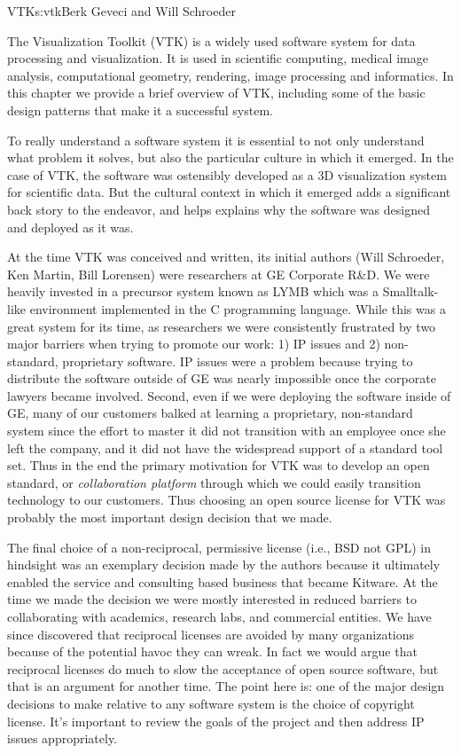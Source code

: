 \begin{aosachapter}{VTK}{s:vtk}{Berk Geveci and Will Schroeder}

The Visualization Toolkit (VTK) is a widely used software system for
data processing and visualization. It is used in scientific computing,
medical image analysis, computational geometry, rendering, image
processing and informatics. In this chapter we provide a brief
overview of VTK, including some of the basic design patterns that make
it a successful system.

To really understand a software system it is essential to not only
understand what problem it solves, but also the particular culture in
which it emerged. In the case of VTK, the software was ostensibly
developed as a 3D visualization system for scientific data. But the
cultural context in which it emerged adds a significant back story to
the endeavor, and helps explains why the software was designed and
deployed as it was.

At the time VTK was conceived and written, its initial authors (Will
Schroeder, Ken Martin, Bill Lorensen) were researchers at GE Corporate
R\&D\@. We were heavily invested in a precursor system known as LYMB
which was a Smalltalk-like environment implemented in the C
programming language. While this was a great system for its time, as
researchers we were consistently frustrated by two major barriers when
trying to promote our work: 1) IP issues and 2) non-standard,
proprietary software. IP issues were a problem because trying to
distribute the software outside of GE was nearly impossible once the
corporate lawyers became involved. Second, even if we were deploying
the software inside of GE, many of our customers balked at learning a
proprietary, non-standard system since the effort to master it did not
transition with an employee once she left the company, and it did not
have the widespread support of a standard tool set. Thus in the end
the primary motivation for VTK was to develop an open standard, or
\emph{collaboration platform} through which we could easily transition
technology to our customers. Thus choosing an open source license for
VTK was probably the most important design decision that we made.

The final choice of a non-reciprocal, permissive license (i.e., BSD
not GPL) in hindsight was an exemplary decision made by the authors
because it ultimately enabled the service and consulting based
business that became Kitware. At the time we made the decision we were
mostly interested in reduced barriers to collaborating with academics,
research labs, and commercial entities. We have since discovered that
reciprocal licenses are avoided by many organizations because of the
potential havoc they can wreak. In fact we would argue that reciprocal
licenses do much to slow the acceptance of open source software, but
that is an argument for another time. The point here is: one of the
major design decisions to make relative to any software system is the
choice of copyright license. It's important to review the goals of the
project and then address IP issues appropriately.


\end{aosachapter}
